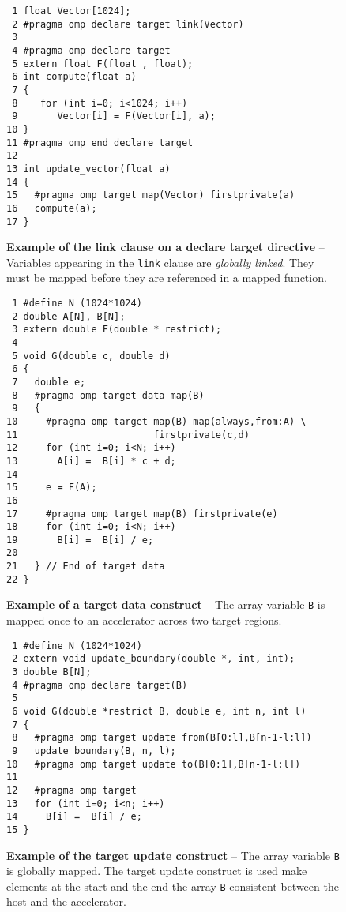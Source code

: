 \begin{figure*}[!tb]
\begin{verbatim}
 1 float Vector[1024];
 2 #pragma omp declare target link(Vector)
 3 
 4 #pragma omp declare target
 5 extern float F(float , float);
 6 int compute(float a)
 7 {
 8    for (int i=0; i<1024; i++)
 9       Vector[i] = F(Vector[i], a);
10 }
11 #pragma omp end declare target
12 
13 int update_vector(float a)
14 {
15   #pragma omp target map(Vector) firstprivate(a)
16   compute(a);
17 }
\end{verbatim}
\caption{ \textbf {Example of the link clause on a declare target directive} -- \small
          Variables appearing in the \texttt{link} clause are \emph{globally linked}.  
          They must be mapped before they are referenced in a mapped function.
         }
\label{figure:chapter6-link}
\end{figure*}


\begin{figure*}[!tbhp]
\begin{verbatim}
 1 #define N (1024*1024)
 2 double A[N], B[N];
 3 extern double F(double * restrict);
 4 
 5 void G(double c, double d)
 6 {
 7   double e;
 8   #pragma omp target data map(B)
 9   {
10     #pragma omp target map(B) map(always,from:A) \
11                        firstprivate(c,d)
12     for (int i=0; i<N; i++)
13       A[i] =  B[i] * c + d;
14 
15     e = F(A);
16 
17     #pragma omp target map(B) firstprivate(e)
18     for (int i=0; i<N; i++)
19       B[i] =  B[i] / e;
20 
21   } // End of target data
22 }
\end{verbatim}
\caption{ \textbf {Example of a target data construct} -- \small
          The array variable \texttt{B} is mapped once to an accelerator
          across two target regions.
         }
\label{figure:chapter6-target-data-v1}
\end{figure*}


\begin{figure*}[!tb]
\begin{verbatim}
 1 #define N (1024*1024)
 2 extern void update_boundary(double *, int, int);
 3 double B[N];
 4 #pragma omp declare target(B)
 5 
 6 void G(double *restrict B, double e, int n, int l)
 7 {
 8   #pragma omp target update from(B[0:l],B[n-1-l:l])
 9   update_boundary(B, n, l);
10   #pragma omp target update to(B[0:1],B[n-1-l:l])
11 
12   #pragma omp target
13   for (int i=0; i<n; i++)
14     B[i] =  B[i] / e;
15 }
\end{verbatim}
\caption{ \textbf {Example of the target update construct} -- \small
          The array variable \texttt{B} is globally mapped.  The target update
          construct is used make elements at the start and the end the
          array \texttt{B} consistent between the host and the accelerator.
         }
\label{figure:chapter6-target-update-v1}
\end{figure*}


